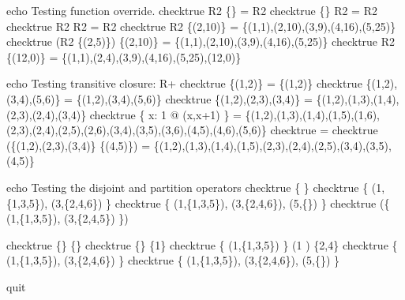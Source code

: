 

echo     Testing function override.
checktrue R2 \oplus \{\} = R2
checktrue \{\} \oplus R2 = R2
checktrue R2 \oplus R2   = R2
checktrue R2 \oplus \{(2,10)\} = \{(1,1),(2,10),(3,9),(4,16),(5,25)\}
checktrue (R2 \cup \{(2,5)\}) \oplus \{(2,10)\} = \{(1,1),(2,10),(3,9),(4,16),(5,25)\}
checktrue R2 \oplus \{(12,0)\} = \{(1,1),(2,4),(3,9),(4,16),(5,25),(12,0)\}


echo     Testing transitive closure: R+
checktrue \{(1,2)\} \plus = \{(1,2)\}
checktrue \{(1,2),(3,4),(5,6)\} \plus = \{(1,2),(3,4),(5,6)\}
checktrue \{(1,2),(2,3),(3,4)\} \plus = \{(1,2),(1,3),(1,4),(2,3),(2,4),(3,4)\}
checktrue \{ x: 1  @ (x,x+1) \} \plus = \{(1,2),(1,3),(1,4),(1,5),(1,6),(2,3),(2,4),(2,5),(2,6),(3,4),(3,5),(3,6),(4,5),(4,6),(5,6)\}
checktrue \emptyset \plus = \emptyset
checktrue (\{(1,2),(2,3),(3,4)\} \cup \{(4,5)\}) \plus = \{(1,2),(1,3),(1,4),(1,5),(2,3),(2,4),(2,5),(3,4),(3,5),(4,5)\}


echo     Testing the disjoint and partition operators
checktrue \disjoint \{ \}
checktrue \disjoint \{ (1,\{1,3,5\}), (3,\{2,4,6\}) \}
checktrue \disjoint \{ (1,\{1,3,5\}), (3,\{2,4,6\}), (5,\{\}) \}
checktrue \lnot (\disjoint \{ (1,\{1,3,5\}), (3,\{2,4,5\}) \})

checktrue \{\} \partition \{\}
checktrue \lnot \{\} \partition \{1\}
checktrue \{ (1,\{1,3,5\}) \} \partition (1 ) \setminus \{2,4\}
checktrue \{ (1,\{1,3,5\}), (3,\{2,4,6\}) \}  
checktrue \{ (1,\{1,3,5\}), (3,\{2,4,6\}), (5,\{\}) \}  

quit
